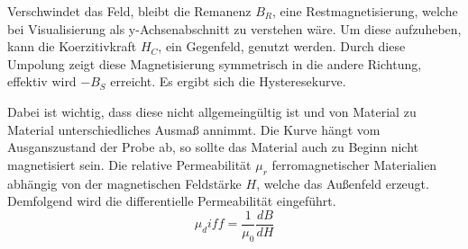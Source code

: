 Verschwindet das Feld, bleibt die Remanenz $B_R$, eine Restmagnetisierung, welche 
bei Visualisierung als y-Achsenabschnitt zu verstehen wäre. Um diese aufzuheben,
kann die Koerzitivkraft $H_C$, ein Gegenfeld, genutzt werden. Durch diese Umpolung 
zeigt diese Magnetisierung symmetrisch in die andere Richtung, effektiv wird 
$-B_S$ erreicht. Es ergibt sich die Hysteresekurve.

Dabei ist wichtig, dass diese nicht allgemeingültig ist und von Material zu 
Material unterschiedliches Ausmaß annimmt. Die Kurve hängt vom Ausganszustand
der Probe ab, so sollte das Material auch zu Beginn nicht magnetisiert sein.
Die relative Permeabilität $\mu_r$ ferromagnetischer Materialien abhängig von 
der magnetischen Feldstärke $H$, welche das Außenfeld erzeugt. Demfolgend wird 
die differentielle Permeabilität eingeführt.
\begin{equation}
    \label{eqn:10}
    \mu_diff = \frac{1}{\mu_0} \frac{dB}{dH}
\end{equation}
